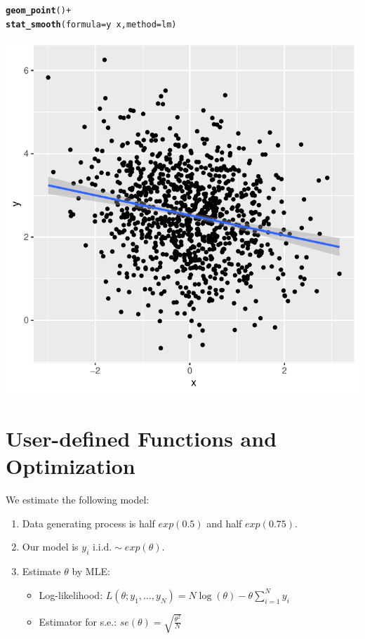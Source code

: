\documentclass[11pt]{article}\usepackage[]{graphicx}\usepackage[]{color}
\makeatletter
\def\maxwidth{ %
  \ifdim\Gin@nat@width>\linewidth
    \linewidth
  \else
    \Gin@nat@width
  \fi
}
\newcommand{\hlopt}[1]{\textcolor[rgb]{0,0,0}{#1}}%
\newcommand{\hlstd}[1]{\textcolor[rgb]{0.345,0.345,0.345}{#1}}%
\newcommand{\hlkwc}[1]{\textcolor[rgb]{0.333,0.667,0.333}{#1}}%
\newcommand{\hlkwd}[1]{\textcolor[rgb]{0.737,0.353,0.396}{\textbf{#1}}}%
\newenvironment{kframe}{%
 \def\at@end@of@kframe{}%
 \ifinner\ifhmode%
  \def\at@end@of@kframe{\end{minipage}}%
  \begin{minipage}{\columnwidth}%
 \fi\fi%
 \def\FrameCommand##1{\hskip\@totalleftmargin \hskip-\fboxsep
 \colorbox{shadecolor}{##1}\hskip-\fboxsep
     \hskip-\linewidth \hskip-\@totalleftmargin \hskip\columnwidth}%
 \MakeFramed {\advance\hsize-\width
   \@totalleftmargin\z@ \linewidth\hsize
   \@setminipage}}%
 {\par\unskip\endMakeFramed%
 \at@end@of@kframe}
\newenvironment{knitrout}{}{} %
\makeatother
\begin{document}
\begin{knitrout}
\begin{kframe}
\begin{alltt}
        \hlkwd{geom_point}\hlstd{()} \hlopt{+}
        \hlkwd{stat_smooth}\hlstd{(}\hlkwc{formula}\hlstd{=y}\hlopt{~}\hlstd{x,} \hlkwc{method}\hlstd{=lm)}
\end{alltt}
\end{kframe}
\includegraphics[width=\maxwidth]{figure/unnamed-chunk-9-2} 

\end{knitrout}

\section{User-defined Functions and Optimization}

We estimate the following model:
\begin{enumerate}
\item Data generating process is half $exp(0.5)$ and half $exp(0.75)$.
\item Our model is $y_i \text{ i.i.d.} \sim exp(\theta)$.
\item Estimate $\theta$ by MLE:
\begin{itemize}
\item Log-likelihood: $L(\theta; y_1,\dots,y_N) = N \log(\theta)-\theta \sum_{i=1}^N y_i $
\item Estimator for s.e.: $se(\theta) = \sqrt{\frac{\theta^2}{N}} $
\end{itemize}
\end{enumerate}
\end{document}
